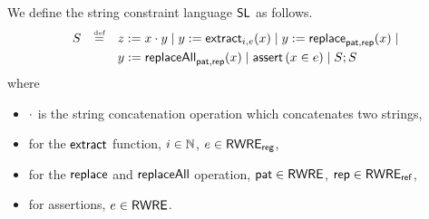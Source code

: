 We define the string constraint language $\mathsf{SL}$ %
as follows. 
\[
\begin{array}{l c l}
\smallskip
S & \eqdef  & z:= x \concat y \mid y := \extract_{i, e}(x) \mid  
y := \replace_{\pat, \rep}(x) \mid \\
& & y := \replaceall_{\pat, \rep}(x)   \mid 
 \ASSERT{x \in e} \mid S; S\
\label{eq:SL}
\end{array}
\]
where 
\begin{itemize}
	\item $\cdot$ is the string concatenation operation which concatenates two strings,
%
\item for the $\mathsf{extract}$ function, $i \in \mathbb{N}$, $e \in {\sf RWRE_{reg}}$,
%
	\item  for the $\mathsf{replace}$ and $\mathsf{replaceAll}$ operation, $\mathsf{pat}\in {\sf RWRE}$, $\mathsf{rep} \in {\sf RWRE_{ref}}$, %
%
	\item for assertions, $e \in {\sf RWRE}$.
\end{itemize} 
%
%


%


